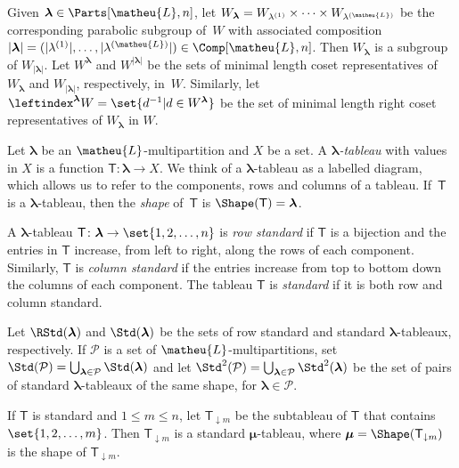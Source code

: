 \documentclass[a4paper,11pt]{amsart}
\newcommand\blam{{\boldsymbol\lambda}}
\newcommand\bmu{{\boldsymbol\mu}}
\numberwithin{equation}{subsection}
\theoremstyle{definition}
\theoremstyle{theorem}
\theoremstyle{remark}
\newcommand\sL{\matheu{L}}
\newcommand\CP{\mathcal{P}}
\newcommand\Sym{W}
\newcommand\bT{{\mathsf{T}}}
\begin{document}
\begin{Definition}\label{D:Wlam}
 Given $\blam\in\Parts[\sL,n]$, let
 $\Sym_\blam=\Sym_{\lambda^{(1)}}\times\dots\times\Sym_{\lambda^{(\sL)}}$
 be the corresponding parabolic subgroup of~$\Sym$ with associated composition
 $|\blam|=(|\lambda^{(1)}|,\dots,|\lambda^{(\sL)}|)\in \Comp[\sL,n]$. Then $\Sym_\blam$ is a subgroup of
 $\Sym_{|\blam|}$. Let $\Sym^\blam$ and $\Sym^{|\blam|}$ be the sets of
 minimal length coset representatives of $\Sym_\blam$ and
 $\Sym_{|\blam|}$, respectively, in~$\Sym$. Similarly, let
 $\leftindex^\blam\Sym=\set{d^{-1}|d\in\Sym^\blam}$ be the set of
 minimal length right coset representatives of $\Sym_\blam$ in $\Sym$.
\end{Definition}


\begin{Definition}\label{D:tableaux}
 Let $\blam$ be an $\sL$-multipartition and $X$ be a set. A
 \emph{$\blam$-tableau} with values in $X$ is a function
 $\bT\colon\blam\to X$. We think of a $\blam$-tableau as a labelled
 diagram, which allows us to refer to the components, rows and columns
 of a tableau. If~$\bT$ is a $\blam$-tableau, then the \emph{shape}
 of~$\bT$ is $\Shape(\bT)=\blam$.

 A $\blam$-tableau $\bT\colon\blam\to\set{1,2,\dots,n}$ is \emph{row
 standard} if $\bT$ is a bijection and the entries in $\bT$ increase,
 from left to right, along the rows of each component.  Similarly, $\bT$
 is \emph{column standard} if the entries increase from top to bottom
 down the columns of each component. The tableau $\bT$ is
 \emph{standard} if it is both row and column standard.

 Let $\RStd(\blam)$ and $\Std(\blam)$ be the sets of row standard and
 standard $\blam$-tableaux, respectively.  If $\CP$ is a set of
 $\sL$-multipartitions, set $\Std(\CP)=\bigcup_{\blam\in\CP}\Std(\blam)$ and
 let $\Std^2(\CP)=\bigcup_{\blam\in\CP}\Std^2(\blam)$ be the set of pairs
 of standard $\blam$-tableaux of the same shape, for $\blam\in\CP$.
 \end{Definition}

  If $\bT$ is standard and $1\le m\le n$, let $\bT_{\downarrow m}$ be the
 subtableau of $\bT$ that contains $\set{1,2,\dots,m}$. Then
 $\bT_{\downarrow m}$ is a standard $\bmu$-tableau, where
 $\bmu=\Shape(\bT_{\downarrow m})$ is the shape of $\bT_{\downarrow m}$.
\end{document}
